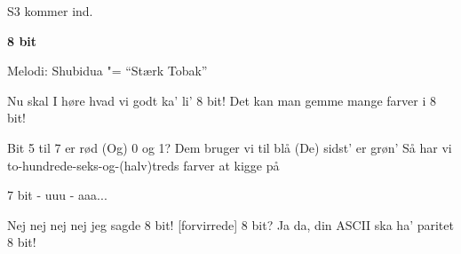 \documentclass[a4paper,11pt]{article}
\begin{document}
S3 kommer ind.

\textbf{8 bit}

Melodi: Shubidua "= ``Stærk Tobak''

\begin{song}
 Nu skal I høre hvad vi godt ka' li'
 8 bit!
 Det kan man gemme mange farver i
 8 bit!

 Bit 5 til 7 er rød
 (Og) 0 og 1?
 Dem bruger vi til blå
 (De) sidst' er grøn'
 Så har vi to-hundrede-seks-og-(halv)treds
farver at kigge på

 7 bit - uuu - aaa...

 Nej nej nej nej jeg sagde 8 bit!
[forvirrede] 8 bit?
 Ja da, din ASCII ska ha' paritet
 8 bit!
\end{song}
\end{document}
